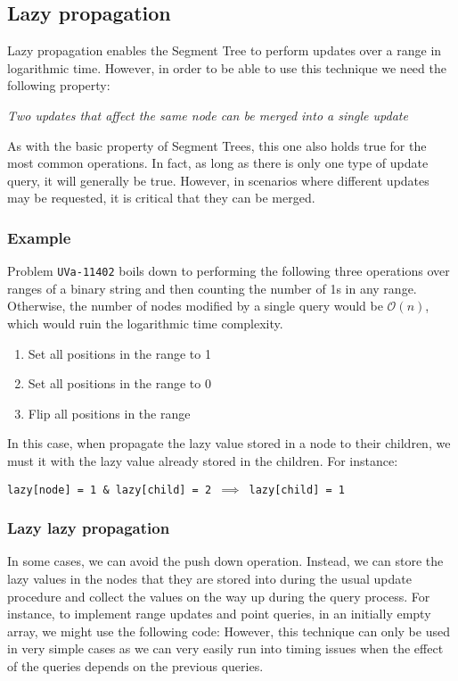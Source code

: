 \newpage
\subsection{Lazy propagation}
Lazy propagation enables the Segment Tree to perform updates over a range 
in logarithmic time. However, in order to be able to use this technique we
need the following property:
\begin{center}
\itshape
Two updates that affect the same node can be merged into a single update 
\end{center}
As with the basic property of Segment Trees, this one also holds true for
the most common operations. In fact, as long as there is only one type of
update query, it will generally be true.
However, in scenarios where different updates may be requested, it is critical
that they can be merged. 
\subsubsection*{Example}
Problem \texttt{UVa-11402} boils down to performing the following three
operations over ranges of a binary string and then counting the number 
of 1s in any range.  Otherwise, the number of nodes modified by a single
query would be $\mathcal{O}(n)$, which would ruin the logarithmic time
complexity.
\begin{enumerate}
		\setlength{\itemsep}{0pt}
		\item Set all positions in the range to 1
		\item Set all positions in the range to 0
		\item Flip all positions in the range 
\end{enumerate}
In this case, when propagate the lazy value stored in a node to their 
children, we must  it with the lazy value already stored
in the children. For instance:
\begin{center}
\texttt{lazy[node] = 1 \& lazy[child] = 2 $\implies$ 
lazy[child] = 1} 
\end{center}
\subsubsection*{Lazy lazy propagation}
In some cases, we can avoid the push down operation. Instead,
we can store the lazy values in the nodes that they are
stored into during the usual update procedure and collect
the values on the way up during the query process. For instance,
to implement range updates and point queries, in an initially
empty array, we might use the following code:
However, this technique can only be used in very simple cases
as we can very easily run into timing issues when the 
effect of the queries depends on the previous queries.

